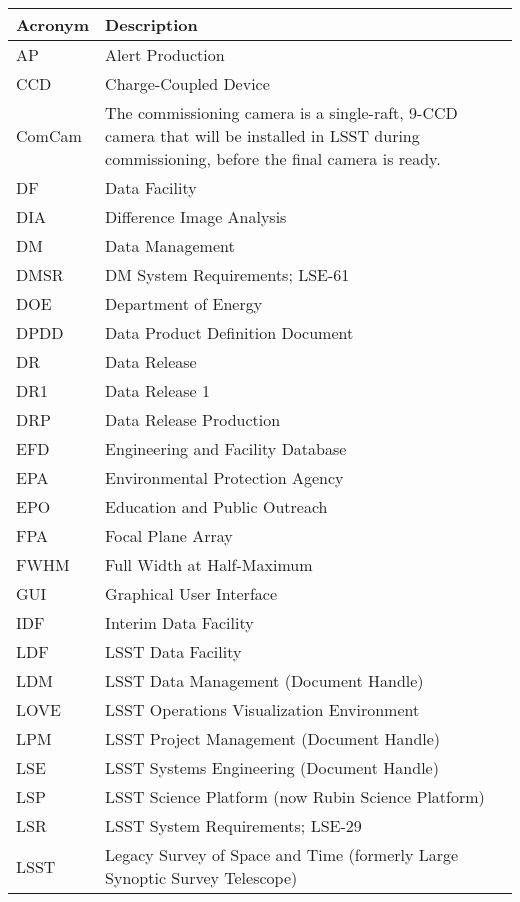 \addtocounter{table}{-1}
\begin{longtable}{p{}p{}}\hline
\textbf{Acronym} & \textbf{Description}  \\\hline

AP & Alert Production \\\hline
CCD & Charge-Coupled Device \\\hline
ComCam & The commissioning camera is a single-raft, 9-CCD camera that will be installed in LSST during commissioning, before the final camera is ready. \\\hline
DF & Data Facility \\\hline
DIA & Difference Image Analysis \\\hline
DM & Data Management \\\hline
DMSR & DM System Requirements; LSE-61 \\\hline
DOE & Department of Energy \\\hline
DPDD & Data Product Definition Document \\\hline
DR & Data Release \\\hline
DR1 & Data Release 1 \\\hline
DRP & Data Release Production \\\hline
EFD & Engineering and Facility Database \\\hline
EPA & Environmental Protection Agency \\\hline
EPO & Education and Public Outreach \\\hline
FPA & Focal Plane Array \\\hline
FWHM & Full Width at Half-Maximum \\\hline
GUI & Graphical User Interface \\\hline
IDF & Interim Data Facility \\\hline
LDF & LSST Data Facility \\\hline
LDM & LSST Data Management (Document Handle) \\\hline
LOVE & LSST Operations Visualization Environment \\\hline
LPM & LSST Project Management (Document Handle) \\\hline
LSE & LSST Systems Engineering (Document Handle) \\\hline
LSP & LSST Science Platform (now Rubin Science Platform) \\\hline
LSR & LSST System Requirements; LSE-29 \\\hline
LSST & Legacy Survey of Space and Time (formerly Large Synoptic Survey Telescope) \\\hline

\end{longtable}
